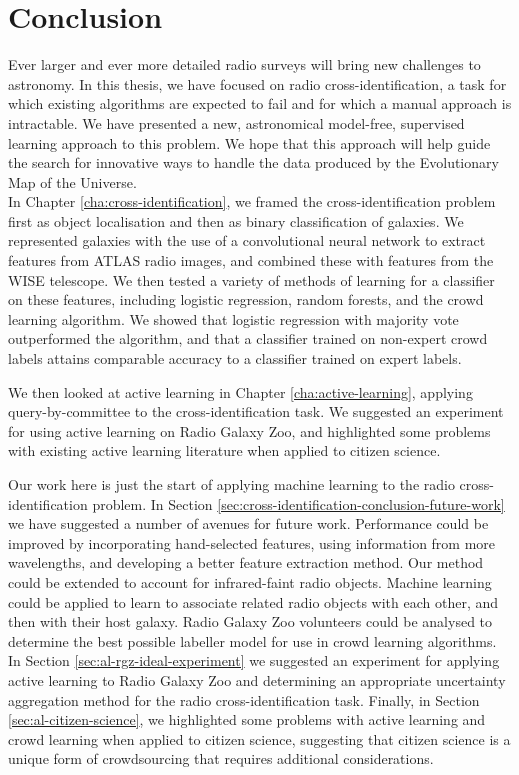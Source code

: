 
\chapter{Conclusion}
\label{cha:conclusion}

    Ever larger and ever more detailed radio surveys will bring new challenges
    to astronomy. In this thesis, we have focused on radio cross-identification,
    a task for which existing algorithms are expected to fail and for which a
    manual approach is intractable. We have presented a new, astronomical
    model-free, supervised learning approach to this problem. We hope that this
    approach will help guide the search for innovative ways to handle the data
    produced by the Evolutionary Map of the Universe.\\

    In Chapter \ref{cha:cross-identification}, we framed the
    cross-identification problem first as object localisation and then as binary
    classification of galaxies. We represented galaxies with the use of a
    convolutional neural network to extract features from ATLAS radio images,
    and combined these with features from the WISE telescope. We then tested a
    variety of methods of learning for a classifier on these features, including
    logistic regression, random forests, and the \citet{raykar10} crowd learning
    algorithm. We showed that logistic regression with majority vote
    outperformed the \citeauthor{raykar10} algorithm, and that a classifier
    trained on non-expert crowd labels attains comparable accuracy to a
    classifier trained on expert labels.

    We then looked at active learning in Chapter \ref{cha:active-learning},
    applying query-by-committee to the cross-identification task. We suggested
    an experiment for using active learning on Radio Galaxy Zoo, and highlighted
    some problems with existing active learning literature when applied to
    citizen science.

    Our work here is just the start of applying machine learning to the radio
    cross-identification problem. In Section
    \ref{sec:cross-identification-conclusion-future-work} we have suggested a
    number of avenues for future work. Performance could be improved by
    incorporating hand-selected features, using information from more
    wavelengths, and developing a better feature extraction method. Our method
    could be extended to account for infrared-faint radio objects. Machine
    learning could be applied to learn to associate related radio objects with
    each other, and then with their host galaxy. Radio Galaxy Zoo volunteers
    could be analysed to determine the best possible labeller model for use in
    crowd learning algorithms. In Section \ref{sec:al-rgz-ideal-experiment} we
    suggested an experiment for applying active learning to Radio Galaxy Zoo and
    determining an appropriate uncertainty aggregation method for the radio
    cross-identification task. Finally, in Section \ref{sec:al-citizen-science},
    we highlighted some problems with active learning and crowd learning when
    applied to citizen science, suggesting that citizen science is a unique form
    of crowdsourcing that requires additional considerations.
